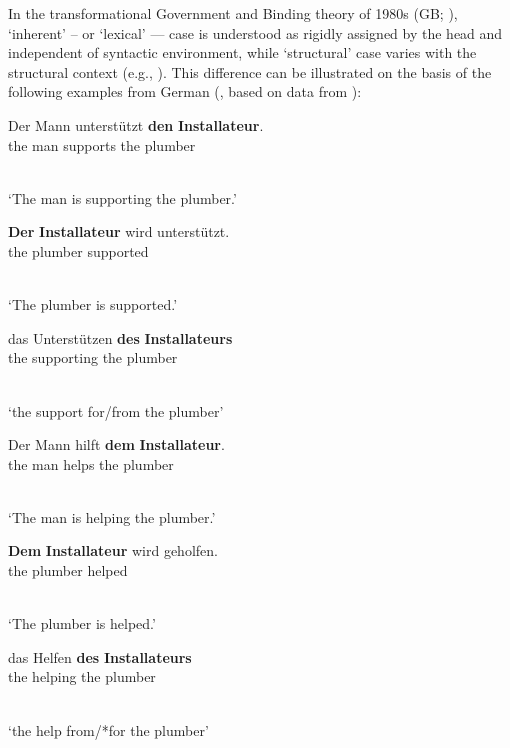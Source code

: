 \documentclass[output=paper]{langsci/langscibook}
\begin{document}
In the transformational Government and Binding theory of 1980s (GB; \citealt{chom:81,chom:86a}), ‘inherent’ – or ‘lexical’ — case is understood as rigidly assigned by the head and independent of syntactic environment, while ‘structural’ case varies with the structural context (e.g., \citealt[70]{Haider85b-ohne-crossref}).  This difference can be illustrated on the basis of the following examples from German (\citealt[63]{Prze99b}, based on data from \citealt{HM94a}):
\begin{examples} 
\item \label{ex:unterstutzen}
  \begin{examples}
  \item
    \begin{gloss}     
      Der Mann unterst\"utzt \textbf{den} \textbf{Installateur}. \\ 
      the man\Nom{} supports the plumber\Acc{}
    \end{gloss}\\[\glosslen]
    `The man is supporting the plumber.'
  \item 
    \begin{gloss}
      \textbf{Der} \textbf{Installateur} wird unterst\"utzt. \\
      the plumber\Nom{} \Aux{} supported
    \end{gloss}\\[\glosslen]
    `The plumber is supported.'
  \item
    \begin{gloss}     
      das Unterst\"utzen \textbf{des} \textbf{Installateurs} \\
      the supporting the plumber\Gen{}
    \end{gloss}\\[\glosslen]
    `the support for/from the plumber'
  \end{examples}
\item \label{ex:helfen}
  \begin{examples}
  \item 
    \begin{gloss}
      Der Mann hilft \textbf{dem} \textbf{Installateur}. \\
      the man\Nom{} helps the plumber\Dat{}
    \end{gloss}\\[\glosslen]
    `The man is helping the plumber.'
  \item 
    \begin{gloss}
      \textbf{Dem} \textbf{Installateur} wird geholfen. \\
      the plumber\Dat{} \Aux{} helped
    \end{gloss}\\[\glosslen]
    `The plumber is helped.'
  \item
    \begin{gloss}
      das Helfen \textbf{des} \textbf{Installateurs} \\
      the helping the plumber\Gen{}
    \end{gloss}\\[\glosslen]
    `the help from/*for the plumber'
  \end{examples}
\end{examples}
\end{document}

